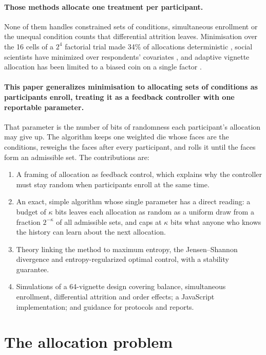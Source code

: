 \documentclass[11pt]{article}
\begin{document}
\paragraph{Those methods allocate one treatment per participant.} None of them handles constrained sets of conditions, simultaneous enrollment or the unequal condition counts that differential attrition leaves. Minimisation over the 16 cells of a $2^4$ factorial trial made 34\% of allocations deterministic \citep{kuhn2019}, social scientists have minimized over respondents' covariates \citep{moore2013}, and adaptive vignette allocation has been limited to a biased coin on a single factor \citep{kim2024}.

\paragraph{This paper generalizes minimisation to allocating sets of conditions as participants enroll, treating it as a feedback controller with one reportable parameter.} That parameter is the number of bits of randomness each participant's allocation may give up. The algorithm keeps one weighted die whose faces are the conditions, reweighs the faces after every participant, and rolls it until the faces form an admissible set. The contributions are:
\begin{enumerate}
\item A framing of allocation as feedback control, which explains why the controller must stay random when participants enroll at the same time.
\item An exact, simple algorithm whose single parameter has a direct reading: a budget of $\kappa$ bits leaves each allocation as random as a uniform draw from a fraction $2^{-\kappa}$ of all admissible sets, and caps at $\kappa$ bits what anyone who knows the history can learn about the next allocation.
\item Theory linking the method to maximum entropy, the Jensen--Shannon divergence and entropy-regularized optimal control, with a stability guarantee.
\item Simulations of a 64-vignette design covering balance, simultaneous enrollment, differential attrition and order effects; a JavaScript implementation; and guidance for protocols and reports.
\end{enumerate}

\section{The allocation problem}\label{sec:problem}
\end{document}
